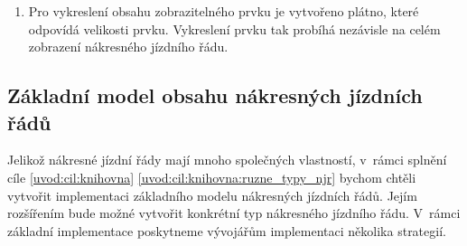 \begin{enumerate}[label=\color{reqcolor}\textbf{R{\arabic*}},resume]
	\item \label{spec:zobrazitelne_prvky_vykresleni} Pro vykreslení obsahu zobrazitelného prvku je vytvořeno plátno, které odpovídá velikosti prvku. Vykreslení prvku tak probíhá nezávisle na celém zobrazení nákresného jízdního řádu.
\end{enumerate}

\subsection*{Základní model obsahu nákresných jízdních řádů}
\label{kap2:req:model_impl}
Jelikož nákresné jízdní řády mají mnoho společných vlastností, v~rámci splnění cíle \ref{uvod:cil:knihovna} \ref{uvod:cil:knihovna:ruzne_typy_njr} bychom chtěli vytvořit implementaci základního modelu nákresných jízdních řádů. Jejím rozšířením bude možné vytvořit konkrétní typ nákresného jízdního řádu. V~rámci základní implementace poskytneme vývojářům implementaci několika strategií.